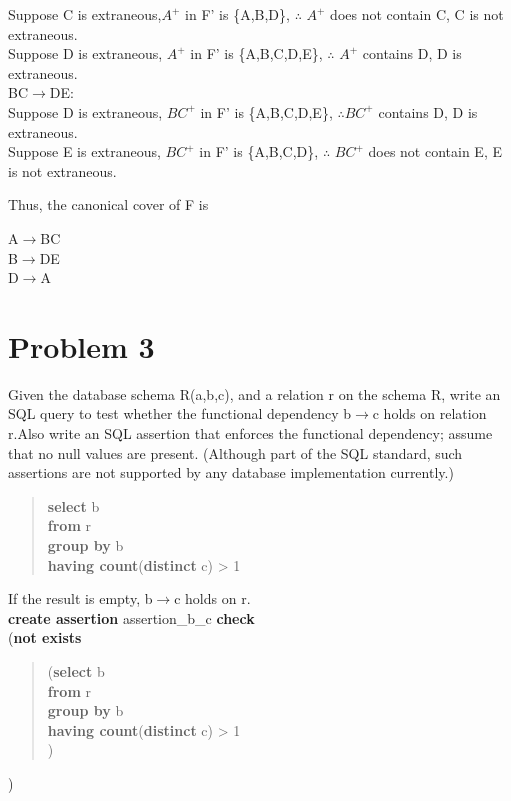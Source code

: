 \documentclass[paper=a4, fontsize=11pt]{scrartcl} %
\numberwithin{equation}{section} %
\numberwithin{figure}{section} %
\numberwithin{table}{section} %
\begin{document}
\begin{itemize}
\begin{itemize}
        Suppose C is extraneous,$A^{+}$ in F' is \{A,B,D\}, $\therefore$ $A^{+}$ does not contain C, C is not extraneous.\\
        Suppose D is extraneous, $A^{+}$ in F' is \{A,B,C,D,E\}, $\therefore$ $A^{+}$ contains D, D is extraneous.\\
        BC$\rightarrow$DE:\\
        Suppose D is extraneous, $BC^{+}$ in F' is \{A,B,C,D,E\}, $\therefore$$ BC^{+}$ contains D, D is extraneous.\\
        Suppose E is extraneous, $BC^{+}$ in F' is \{A,B,C,D\}, $\therefore$ $BC^{+}$ does not contain E, E is not extraneous.\\
    \end{itemize}
    Thus, the canonical cover of F is
    \begin{center}
A$\rightarrow$BC \\
B$\rightarrow$DE \\
D$\rightarrow$A
\end{center}
\end{itemize}
\section{Problem 3}
Given the database schema R(a,b,c), and a relation r on the schema R, write an SQL query to test whether the functional dependency b$\rightarrow$c holds on relation r.Also write an SQL assertion that enforces the functional dependency; assume that no null values are present. (Although part of the SQL standard, such assertions are not supported by any database implementation currently.)
\begin{quote}
\textbf{select} b \\
\textbf{from} r \\
\textbf{group by} b\\
\textbf{having count}(\textbf{distinct} c) > 1\\
\end{quote}
If the result is empty, b$\rightarrow$c holds on r. \\

\textbf{create assertion} assertion\_b\_c \textbf{check} \\
(\textbf{not exists}  \\
    \begin{quote}
    (\textbf{select} b \\
    \textbf{from} r \\
    \textbf{group by} b \\
    \textbf{having count}(\textbf{distinct} c) > 1 \\
    )
    \end{quote}
)
\end{document}
